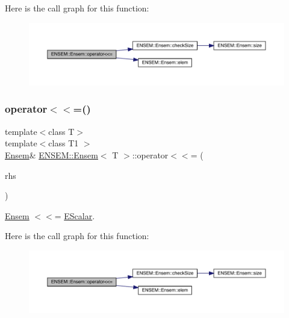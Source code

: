 Here is the call graph for this function\+:
\nopagebreak
\begin{figure}[H]
\begin{center}
\leavevmode
\includegraphics[width=350pt]{d7/d3e/classENSEM_1_1Ensem_a9aecabccdc31d9b43db877a82879f702_cgraph}
\end{center}
\end{figure}
\mbox{\label{classENSEM_1_1Ensem_a9aecabccdc31d9b43db877a82879f702}} 
\subsubsection{\texorpdfstring{operator$<$$<$=()}{operator<<=()}\hspace{0.1cm}{\footnotesize\ttfamily [2/3]}}
{\footnotesize\ttfamily template$<$class T$>$ \\
template$<$class T1 $>$ \\
\mbox{\hyperlink{classENSEM_1_1Ensem}{Ensem}}\& \mbox{\hyperlink{classENSEM_1_1Ensem}{E\+N\+S\+E\+M\+::\+Ensem}}$<$ T $>$\+::operator$<$$<$= (\begin{DoxyParamCaption}\item[{const \mbox{\hyperlink{classENSEM_1_1EScalar}{E\+Scalar}}$<$ T1 $>$ \&}]{rhs }\end{DoxyParamCaption})\hspace{0.3cm}{\ttfamily [inline]}}



\mbox{\hyperlink{classENSEM_1_1Ensem}{Ensem}} $<$$<$= \mbox{\hyperlink{classENSEM_1_1EScalar}{E\+Scalar}}. 

Here is the call graph for this function\+:
\nopagebreak
\begin{figure}[H]
\begin{center}
\leavevmode
\includegraphics[width=350pt]{d7/d3e/classENSEM_1_1Ensem_a9aecabccdc31d9b43db877a82879f702_cgraph}
\end{center}
\end{figure}
\mbox{\label{classENSEM_1_1Ensem_a9aecabccdc31d9b43db877a82879f702}} 

